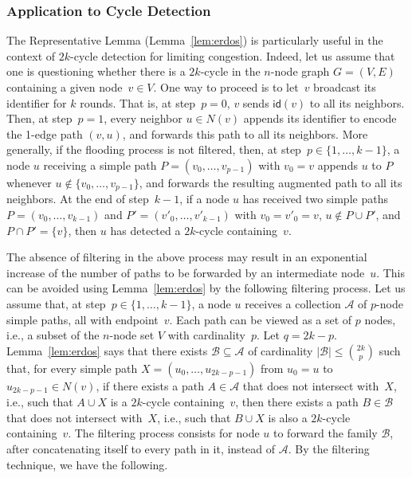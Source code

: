 \documentclass{article}
\newcommand{\id}{\mathsf{id}}
\begin{document}
\subsubsection{Application to Cycle Detection} 
\label{subsubsec:application-filtering}

The Representative Lemma (Lemma~\ref{lem:erdos}) is particularly useful in the context of $2k$-cycle detection for limiting congestion. Indeed, let us assume that one is questioning whether there is a $2k$-cycle in the $n$-node graph $G=(V,E)$ containing a given node~$v\in V$. One way to proceed is to let~$v$ broadcast its identifier for $k$ rounds. That is, at step~$p=0$, $v$ sends $\id(v)$ to all its neighbors. Then, at step~$p=1$, every neighbor $u\in N(v)$ appends its identifier to encode the 1-edge path $(v,u)$, and forwards this path to all its neighbors. More generally, if the flooding process is not filtered, then, at step~$p\in\{1,\dots,k-1\}$, a node $u$ receiving a simple path $P=(v_0,\dots,v_{p-1})$ with $v_0=v$ appends $u$ to $P$ whenever $u\notin \{v_0,\dots,v_{p-1}\}$, and forwards the resulting augmented path to all its neighbors. At the end of step~$k-1$, if a node $u$ has received two simple paths $P=(v_0,\dots,v_{k-1})$ and $P'=(v'_0,\dots,v'_{k-1})$ with $v_0=v'_0=v$, $u\notin P\cup P'$, and $P\cap P'=\{v\}$, then $u$ has detected a $2k$-cycle containing~$v$. 

The absence  of filtering in the above process may result in an exponential increase of the number of paths to be forwarded by an intermediate node~$u$. This can be avoided using Lemma~\ref{lem:erdos} by the following filtering process. Let us assume that, at step~$p\in\{1,\dots,k-1\}$, a node $u$ receives a collection $\mathcal{A}$ of $p$-node simple paths, all with endpoint~$v$. Each path can be viewed as a set of $p$ nodes, i.e., a subset of the $n$-node set $V$ with cardinality~$p$. 
Let $q=2k-p$. Lemma~\ref{lem:erdos} says that there exists $\mathcal{B}\subseteq \mathcal{A}$ of cardinality $|\mathcal{B}|\leq \binom{2k}{p}$ such that, for every simple path 
$X=(u_0,\dots,u_{2k-p-1})$ from $u_0=u$ to $u_{2k-p-1}\in N(v)$, if there exists a path $A\in \mathcal{A}$ that does not intersect with~$X$, i.e., such that $A\cup X$ is a $2k$-cycle containing~$v$, then there exists a path $B\in \mathcal{B}$ that does not intersect with~$X$, i.e., such that $B\cup X$ is also a $2k$-cycle containing~$v$. The filtering process consists for node $u$ to forward the family $\mathcal{B}$, after concatenating itself to every path in it, instead of $\mathcal{A}$. By the filtering technique, we have the following. 
\end{document}
